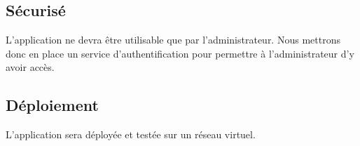 \subsection{Sécurisé}L’application ne devra être utilisable que par l'administrateur. Nous mettrons donc en place un service d'authentification pour permettre à l'administrateur d'y avoir accès.

\subsection{Déploiement}L'application sera déployée et testée sur un réseau virtuel.


